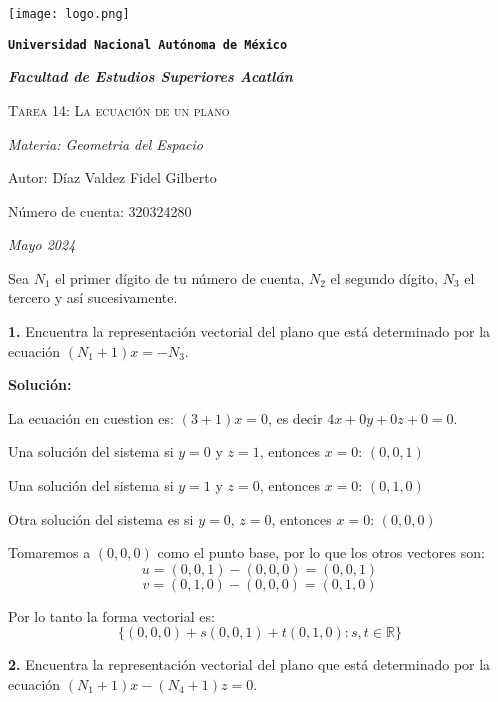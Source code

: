 \documentclass{article}
\begin{document}
\begin{titlepage}
    \centering   
    {\texttt{[image: logo.png]}\par}
    {\texttt{\bfseries \LARGE Universidad Nacional Autónoma de México} \par}
    \vspace{1cm}
    {\itshape \Large \bfseries Facultad de Estudios Superiores Acatlán \par}
    \vspace{3cm}
    {\scshape \Huge Tarea 14: La ecuación de un plano\par}
    \vspace {3cm}
    {\slshape \Large Materia: Geometria del Espacio \par}
    \vspace{2cm}
    {\Large Autor: Díaz Valdez Fidel Gilberto\par}
    {\Large Número de cuenta: 320324280\par}
    \vfill
    {\itshape Mayo 2024 \par}
\end{titlepage}
Sea $N_1$ el primer dígito de tu número de cuenta, $N_2$ el segundo dígito, $N_3$ el tercero y así
sucesivamente.
\vspace{10pt}

\textbf{1.} Encuentra la representación vectorial del plano que está determinado por la ecuación 
$(N_1 + 1)x = -N_3$.
\vspace{10pt}

\textbf{Solución:}
\vspace{10pt}

La ecuación en cuestion es: $(3+1)x = 0$, es decir $4x+0y+0z+0 = 0$.


Una solución del sistema si $y = 0$  y $z = 1$, entonces $x =0$: $(0,0,1)$


Una solución del sistema si $y = 1$  y $z = 0$, entonces $x =0$: $(0,1,0)$


Otra solución del sistema es si $y=0$, $z = 0$, entonces $x =0$: $(0,0,0)$


Tomaremos a $(0,0,0)$ como el punto base, por lo que los otros vectores son:
$$u = (0,0,1)-(0,0,0) = (0,0,1)$$
$$v = (0,1,0)-(0,0,0) = (0,1,0)$$

Por lo tanto la forma vectorial es:
$$\{(0,0,0)+s(0,0,1)+t(0,1,0): s,t \in \mathbb{R}\}$$
\vspace{10pt}

\textbf{2.} Encuentra la representación vectorial del plano que está determinado por la ecuación 
$(N_1 +1)x-(N_4 +1)z = 0$.
\vspace{10pt}
\end{document}
